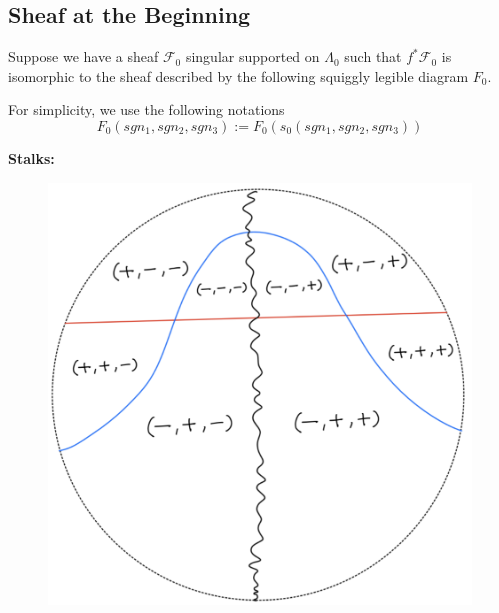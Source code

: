 \subsection*{Sheaf at the Beginning}
Suppose we have a sheaf $\mathscr{F}_0$ singular supported on $\Lambda_0$ such that $f^*\mathscr{F}_0$ is isomorphic to the sheaf described by the following squiggly legible diagram $F_0$.

For simplicity, we use the following notations
\[
F_0(sgn_1,sgn_2,sgn_3):= F_0(s_0(sgn_1,sgn_2,sgn_3))
\]

\textbf{Stalks:}
\begin{figure}[H]
    \centering
    \includegraphics[scale = 0.45]{diagrams/lemma3/19.png} 
    \caption{}
    \label{fig:your-label}
\end{figure}
